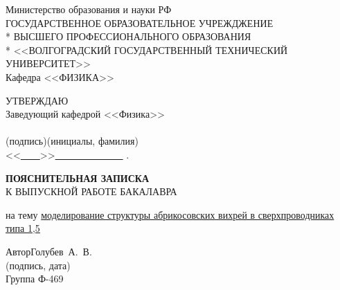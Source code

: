 \begin{titlepage}
	\begin{center}
		Министерство образования и науки РФ \\
		\vspace{.5cm}
		ГОСУДАРСТВЕННОЕ ОБРАЗОВАТЕЛЬНОЕ УЧРЕЖДЖЕНИЕ\\*
		ВЫСШЕГО ПРОФЕССИОНАЛЬНОГО ОБРАЗОВАНИЯ\\*
		<<ВОЛГОГРАДСКИЙ ГОСУДАРСТВЕННЫЙ ТЕХНИЧЕСКИЙ УНИВЕРСИТЕТ>>\\
		\vspace{.5cm}
		Кафедра <<ФИЗИКА>>
		\vspace{.5cm}
	\end{center}
	\begin{flushright}
		УТВЕРЖДАЮ\\
		Заведующий кафедрой <<Физика>>\\
		\vspace{.3cm}
		\underline{\hspace{2cm}}\hspace{1cm}\underline{\hspace{4cm}}\\
		\vspace{-.2cm}\footnotesize(подпись)\hspace{1.8cm}(инициалы, фамилия)
			\hspace*{.2cm}\ \normalsize\\
		\vspace{.3cm}
		<<\underline{\ \ \ \ }>>\underline{\ \ \ \ \ \ \ \ \ \ \ \ \ \ } 
			\the{}.
	\end{flushright}
	\begin{center}
		\LARGE \textbf{ПОЯСНИТЕЛЬНАЯ ЗАПИСКА} \\
		\large К ВЫПУСКНОЙ РАБОТЕ БАКАЛАВРА
	\end{center}
	\begin{center}
		на тему \underline{моделирование структуры абрикосовских вихрей в 
        	сверхпроводниках типа 1,5}
	\end{center}
	\begin{flushleft}
		Автор\hspace{.7cm}Голубев~А.~В.\hfill\underline{\hspace{5cm}}\\
		\vspace{-.2cm}\hspace{14cm}\footnotesize(подпись, дата)\normalsize\\
		\vspace{-.5cm}
		Группа Ф-469\\

\end{flushleft}
\end{titlepage}
